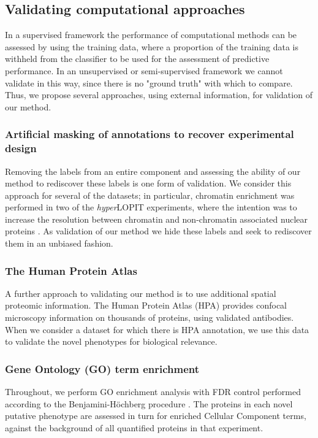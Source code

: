 \documentclass[12pt,english]{article}
\begin{document}
\subsection{Validating computational approaches}
In a supervised framework the performance of computational methods can be assessed by 
using the training data, where a proportion of the training data is withheld from the classifier to be used for the assessment of predictive performance. In an unsupervised or semi-supervised framework we cannot validate in this way, since there is no "ground truth" with which to compare. Thus, we propose several approaches, using external information, for validation of our method.
\subsubsection{Artificial masking of annotations to recover experimental design}
Removing the labels from an entire component and assessing the ability of our method to rediscover these labels is one form of validation. We consider this approach for several of the datasets; in particular, chromatin enrichment was performed in two of the \textit{hyper}LOPIT experiments, where the intention was to increase the resolution between chromatin and non-chromatin associated nuclear proteins \citep{hyper, Mulvey:2017, Thul:2017}. As validation of our method we hide these labels and seek to rediscover them in an unbiased fashion.
\subsubsection{The Human Protein Atlas}
A further approach to validating our method is to use additional spatial proteomic information. The Human Protein Atlas (HPA) \citep{Thul:2017, Sullivan:2018} provides confocal microscopy information on thousands of proteins, using validated antibodies. When we consider a dataset for which there is HPA annotation, we use this data to validate the novel phenotypes for biological relevance. 
\subsubsection{Gene Ontology (GO) term enrichment}
Throughout, we perform GO enrichment analysis with FDR control performed according to the Benjamini-H\"ochberg procedure \citep{FDR:1995,Ashburner:2000,Yu:2012}. The proteins in each novel putative phenotype are assessed in turn for enriched Cellular Component terms, against the background of all quantified proteins in that experiment.
\end{document}
